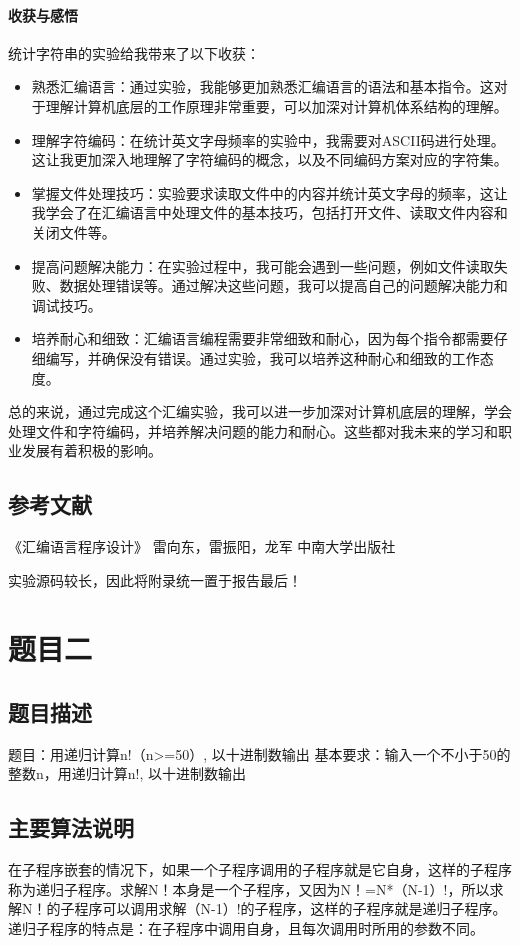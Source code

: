 \documentclass[UTF8,12pt]{article}
\begin{document}
\paragraph{收获与感悟}
统计字符串的实验给我带来了以下收获：
\begin{itemize}
    \item 熟悉汇编语言：通过实验，我能够更加熟悉汇编语言的语法和基本指令。这对于理解计算机底层的工作原理非常重要，可以加深对计算机体系结构的理解。
    \item 理解字符编码：在统计英文字母频率的实验中，我需要对ASCII码进行处理。这让我更加深入地理解了字符编码的概念，以及不同编码方案对应的字符集。
    \item 掌握文件处理技巧：实验要求读取文件中的内容并统计英文字母的频率，这让我学会了在汇编语言中处理文件的基本技巧，包括打开文件、读取文件内容和关闭文件等。
    \item 提高问题解决能力：在实验过程中，我可能会遇到一些问题，例如文件读取失败、数据处理错误等。通过解决这些问题，我可以提高自己的问题解决能力和调试技巧。
    \item 培养耐心和细致：汇编语言编程需要非常细致和耐心，因为每个指令都需要仔细编写，并确保没有错误。通过实验，我可以培养这种耐心和细致的工作态度。
\end{itemize}

总的来说，通过完成这个汇编实验，我可以进一步加深对计算机底层的理解，学会处理文件和字符编码，并培养解决问题的能力和耐心。这些都对我未来的学习和职业发展有着积极的影响。

\subsection{参考文献}
《汇编语言程序设计》    雷向东，雷振阳，龙军   中南大学出版社

实验源码较长，因此将附录统一置于报告最后！

\newpage

\section{题目二}
\subsection{题目描述}
题目：用递归计算n!（n>=50）, 以十进制数输出
基本要求：输入一个不小于50的整数n，用递归计算n!, 以十进制数输出

\subsection{主要算法说明}
在子程序嵌套的情况下，如果一个子程序调用的子程序就是它自身，这样的子程序称为递归子程序。求解N！本身是一个子程序，又因为N！=N*（N-1）!，所以求解N！的子程序可以调用求解（N-1）!的子程序，这样的子程序就是递归子程序。递归子程序的特点是：在子程序中调用自身，且每次调用时所用的参数不同。
\end{document}
